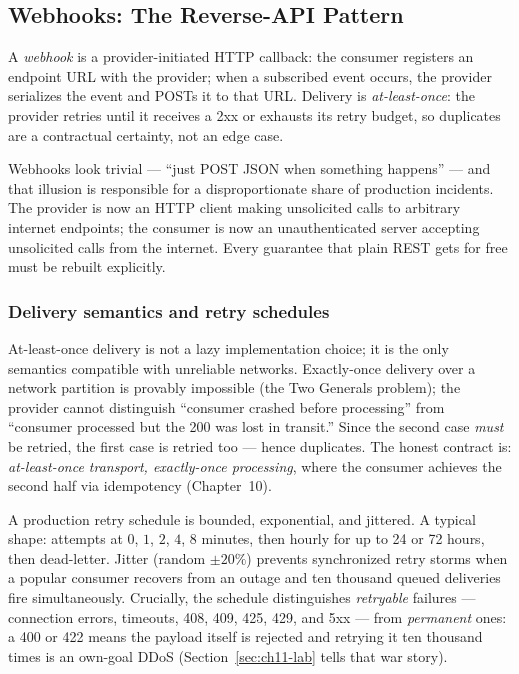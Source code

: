 \subsection{Webhooks: The Reverse-API Pattern}
\label{sec:ch11-webhooks}

\begin{definition}[Webhook]
A \emph{webhook} is a provider-initiated HTTP callback: the consumer
registers an endpoint URL with the provider; when a subscribed event occurs,
the provider serializes the event and POSTs it to that URL. Delivery is
\emph{at-least-once}: the provider retries until it receives a 2xx or
exhausts its retry budget, so duplicates are a contractual certainty, not an
edge case.
\end{definition}

Webhooks look trivial --- ``just POST JSON when something happens'' --- and
that illusion is responsible for a disproportionate share of production
incidents. The provider is now an HTTP client making unsolicited calls to
arbitrary internet endpoints; the consumer is now an unauthenticated server
accepting unsolicited calls from the internet. Every guarantee that plain
REST gets for free must be rebuilt explicitly.

\subsubsection{Delivery semantics and retry schedules}

At-least-once delivery is not a lazy implementation choice; it is the only
semantics compatible with unreliable networks. Exactly-once delivery over a
network partition is provably impossible (the Two Generals problem); the
provider cannot distinguish ``consumer crashed before processing'' from
``consumer processed but the 200 was lost in transit.'' Since the second case
\emph{must} be retried, the first case is retried too --- hence duplicates.
The honest contract is: \emph{at-least-once transport, exactly-once
processing}, where the consumer achieves the second half via idempotency
(Chapter~10).

A production retry schedule is bounded, exponential, and jittered. A typical
shape: attempts at $0$, $1$, $2$, $4$, $8$ minutes, then hourly for up to 24
or 72 hours, then dead-letter. Jitter (random $\pm 20\%$) prevents
synchronized retry storms when a popular consumer recovers from an outage and
ten thousand queued deliveries fire simultaneously. Crucially, the schedule
distinguishes \emph{retryable} failures --- connection errors, timeouts, 408,
409, 425, 429, and 5xx --- from \emph{permanent} ones: a 400 or 422 means the
payload itself is rejected and retrying it ten thousand times is an
own-goal DDoS (Section~\ref{sec:ch11-lab} tells that war story).

